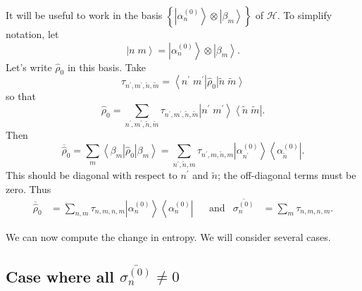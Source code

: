 \documentclass[11pt]{article}
\newcommand{\bra}[1]{\left\langle#1\right|}
\newcommand{\ket}[1]{\left|#1\right\rangle}
\newcommand{\hilb}{\mathcal{H}}
\newcommand{\op}[1]{\hat{#1}}
\newcommand{\bket}[2]{\ket{#1\;#2}}
\newcommand{\bbra}[2]{\bra{#1\;#2}}
\theoremstyle{theorem}
\theoremstyle{remark}
\theoremstyle{step}
\theoremstyle{gap}
\begin{document}
It will be useful to work in the basis \(\left\{\ket{\alpha_n^{(0)}}\otimes\ket{\beta_m}\right\}\) of \(\hilb\). To simplify notation, let
\[
\bket{n}{m} = \ket{\alpha_n^{(0)}}\otimes\ket{\beta_m}.
\]
Let's write \(\op{\rho}_0\) in this basis. Take
\[\tau_{n^\prime, m^\prime, \tilde{n}, \tilde{m}} = \bbra{n^\prime}{m^\prime} \op{\rho}_0 \bket{\tilde{n}}{\tilde{m}}\]
so that
\begin{equation}\label{eq.rho0.withtau}
\op{\rho}_0 = \sum_{n^\prime, m^\prime, \tilde{n}, \tilde{m}} \tau_{n^\prime, m^\prime, \tilde{n}, \tilde{m}} \bket{n^\prime}{m^\prime} \bbra{\tilde{n}}{\tilde{m}}.
\end{equation}
Then
\[
\overline{\op{\rho}}_0 = \sum_m \bra{\beta_m} \op{\rho}_0 \ket{\beta_m} = \sum_{n^\prime, \tilde{n}, m} \tau_{n^\prime, m, \tilde{n}, m} \ket{\alpha_{n^\prime}^{(0)}} \bra{\alpha_{\tilde{n}}^{(0)}}.
\]
This should be diagonal with respect to \(n^\prime\) and \(\tilde{n}\); the off-diagonal terms must be zero. Thus
\begin{align*}
\overline{\op{\rho}}_0 &= \sum_{n, m} \tau_{n, m, n, m} \ket{\alpha_{n}^{(0)}} \bra{\alpha_{n}^{(0)}} &
&\text{and} &
\overline{\sigma_n^{(0)}} &= \sum_{m} \tau_{n, m, n, m}.
\end{align*}



We can now compute the change in entropy. We will consider several cases.

\subsection{Case where all \(\overline{\sigma_n^{(0)}} \neq 0\)}\label{sec.all.sigma.nonzero}
\end{document}
